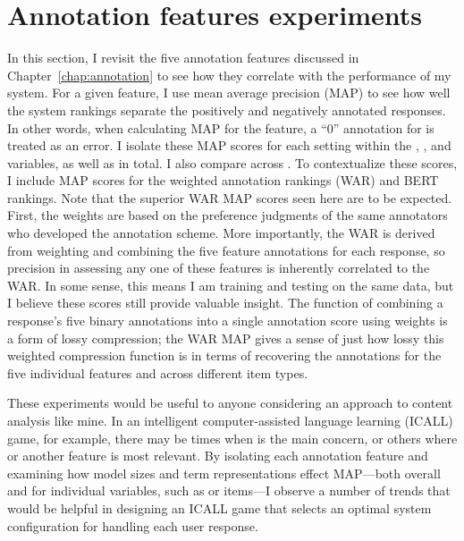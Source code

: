 \section{Annotation features experiments}
\label{sec:exp-annotations}
In this section, I revisit the five annotation features discussed in Chapter~\ref{chap:annotation} to see how they correlate with the performance of my system. For a given feature, I use mean average precision (MAP) to see how well the system rankings separate the positively and negatively annotated responses. In other words, when calculating MAP for the  feature, a ``0'' annotation for  is treated as an error. I isolate these MAP scores for each setting within the , , and  variables, as well as in total. I also compare across . To contextualize these scores, I include MAP scores for the weighted annotation rankings (WAR) and BERT rankings. Note that the superior WAR MAP scores seen here are to be expected. First, the weights are based on the preference judgments of the same annotators who developed the annotation scheme. More importantly, the WAR is derived from weighting and combining the five feature annotations for each response, so precision in assessing any one of these features is inherently correlated to the WAR. In some sense, this means I am training and testing on the same data, but I believe these scores still provide valuable insight. The function of combining a response's five binary annotations into a single annotation score using weights is a form of lossy compression; the WAR MAP gives a sense of just how lossy this weighted compression function is in terms of recovering the annotations for the five individual features and across different item types. 

These experiments would be useful to anyone considering an approach to content analysis like mine. In an intelligent computer-assisted language learning (ICALL) game, for example, there may be times when  is the main concern, or others where  or another feature is most relevant. By isolating each annotation feature and examining how model sizes and term representations effect MAP---both overall and for individual variables, such as  or  items---I observe a number of trends that would be helpful in designing an ICALL game that selects an optimal system configuration for handling each user response.

